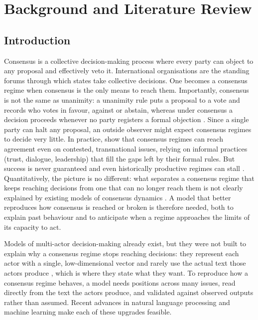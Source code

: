 \chapter{Background and Literature Review}
\label{ch:litreview}

\section{Introduction}
\label{sec:lr-intro}
Consensus is a collective decision-making process where every party can object to any
proposal and effectively veto it. International organisations are the standing forums through which states
take collective decisions. One becomes a consensus regime when consensus is
the only means to reach them. Importantly, consensus is not the same as unanimity: a unanimity
rule puts a proposal to a vote and records who votes in favour, against or abstain, whereas under
consensus a decision proceeds whenever no party registers a formal objection \parencite{Rietig2023}. 
Since a single party can halt any proposal, an outside observer might expect consensus regimes to
decide very little. In practice, \textcite{Sykorabodie2019} show that consensus regimes can reach agreement even on contested,
transnational issues, relying on informal practices (trust, dialogue, leadership) that fill the
gaps left by their formal rules. But success is never guaranteed and even historically productive regimes can stall \parencite{Gardiner2025}. 
Quantitatively, the picture is no different: what separates a consensus regime that keeps reaching decisions from one that can
no longer reach them is not clearly explained by existing models of consensus dynamics \parencite{Perez2018,Tran2024}. A model that better reproduces
how consensus is reached or broken is therefore needed, both to explain past behaviour and to anticipate when a
regime approaches the limits of its capacity to act.

Models of multi-actor decision-making already exist, but they were not built to explain why a consensus regime stops reaching decisions: they
represent each actor with a single, low-dimensional vector \parencite{DeGroot1974,Tsebelis2002} and rarely use the actual text those
actors produce \parencite{Botelho_CoalitionDynamics,Bernardo2021}, which is where they state what they want. To reproduce how a consensus regime behaves, a model needs positions across many issues,
read directly from the text the actors produce, and validated against observed outputs rather
than assumed. Recent advances in natural language processing and machine learning
\parencite{Devlin2019,Grootendorst_BERTopic} make each of these upgrades feasible.

